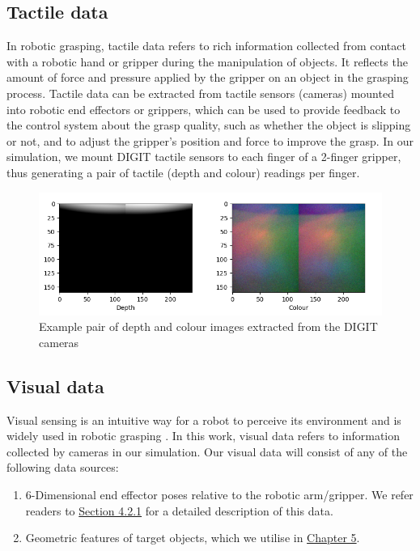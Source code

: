 \documentclass[11pt, a4paper]{report}
\begin{document}
\newpage
\subsection{Tactile data}\label{sec:3.2.1}
In robotic grasping, tactile data refers to rich information collected from contact with a robotic hand or gripper during the manipulation of objects. It reflects the amount of force and pressure applied by the gripper on an object in the grasping process. Tactile data can be extracted from tactile sensors (cameras) mounted into robotic end effectors or grippers, which can be used to provide feedback to the control system about the grasp quality, such as whether the object is slipping or not, and to adjust the gripper's position and force to improve the grasp. In our simulation, we mount DIGIT tactile sensors \cite{Lambeta2020DIGIT} to each finger of a 2-finger gripper, thus generating a pair of tactile (depth and colour) readings per finger.
\begin{figure}[H]
    \centering
    \includegraphics[width=\textwidth]{docs/Project Report/Media/4_2_tactile_data_visualisation.png}
    \caption{Example pair of depth and colour images extracted from the DIGIT cameras}
    \label{fig:3.4}
\end{figure}


\subsection{Visual data}\label{sec:3.2.2}
Visual sensing is an intuitive way for a robot to perceive its environment and is widely used in robotic grasping \cite{GUO2017274}. In this work, visual data refers to information collected by cameras in our simulation. Our visual data will consist of any of the following data sources:
\begin{enumerate}
    \item 6-Dimensional end effector poses relative to the robotic arm/gripper. We refer readers to \hyperref[sec:4.2.1]{Section 4.2.1} for a detailed description of this data.
    \item Geometric features of target objects, which we utilise in \hyperref[chap:5]{Chapter 5}.
\end{enumerate}
\end{document}
